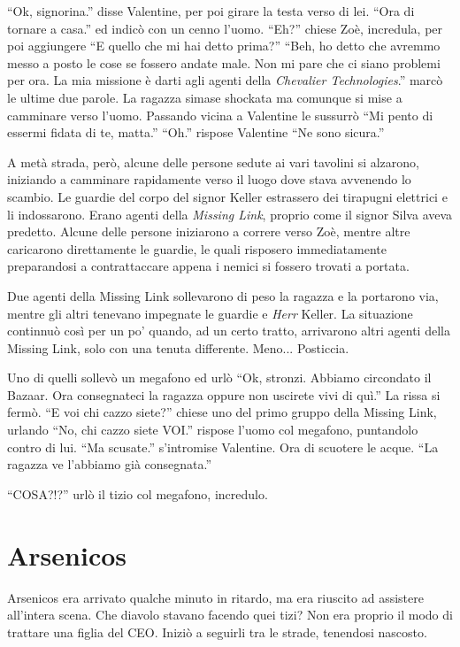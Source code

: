     ``Ok, signorina.'' disse Valentine, per poi girare la testa verso di lei. ``Ora di tornare a casa.'' ed indicò con
    un cenno l'uomo. ``Eh?'' chiese Zoè, incredula, per poi aggiungere ``E quello che mi hai detto prima?'' ``Beh, ho
    detto che avremmo messo a posto le cose se fossero andate male. Non mi pare che ci siano problemi per ora. La mia
    missione è darti agli agenti della \emph{Chevalier Technologies}.'' marcò le ultime due parole. La ragazza simase shockata ma
    comunque si mise a camminare verso l'uomo. Passando vicina a Valentine le sussurrò ``Mi pento di essermi fidata di
    te, matta.'' ``Oh.'' rispose Valentine ``Ne sono sicura.''

    A metà strada, però, alcune delle persone sedute ai vari tavolini si alzarono, iniziando a camminare rapidamente
    verso il luogo dove stava avvenendo lo scambio. Le guardie del corpo del signor Keller estrassero dei tirapugni
    elettrici e li indossarono. Erano agenti della \emph{Missing Link}, proprio come il signor Silva aveva predetto.
    Alcune delle persone iniziarono a correre verso Zoè, mentre altre caricarono direttamente le guardie, le quali
    risposero immediatamente preparandosi a contrattaccare appena i nemici si fossero trovati a portata.

    Due agenti della Missing Link sollevarono di peso la ragazza e la portarono via, mentre gli altri tenevano impegnate
    le guardie e \emph{Herr} Keller. La situazione continnuò così per un po' quando, ad un certo tratto, arrivarono
    altri agenti della Missing Link, solo con una tenuta differente. Meno... Posticcia.

    Uno di quelli sollevò un megafono ed urlò ``Ok, stronzi. Abbiamo circondato il Bazaar. Ora consegnateci la ragazza
    oppure non uscirete vivi di quì.'' La rissa si fermò. ``E voi chi cazzo siete?'' chiese uno del primo gruppo della Missing Link,
    urlando ``No, chi cazzo siete VOI.'' rispose l'uomo col megafono, puntandolo contro di lui. ``Ma scusate.''
    s'intromise Valentine. Ora di scuotere le acque. ``La ragazza ve l'abbiamo già consegnata.''

    ``COSA?!?'' urlò il tizio col megafono, incredulo.

  \section*{Arsenicos}

    Arsenicos era arrivato qualche minuto in ritardo, ma era riuscito ad assistere all'intera scena. Che diavolo stavano
    facendo quei tizi? Non era proprio il modo di trattare una figlia del CEO. Iniziò a seguirli tra le strade,
    tenendosi nascosto.

